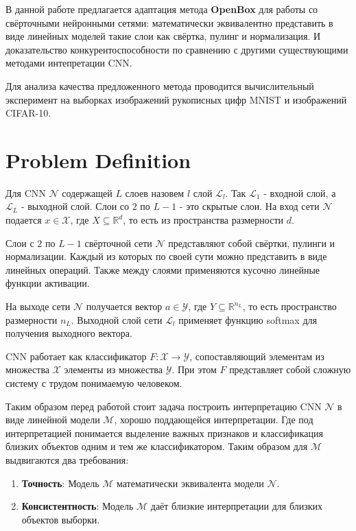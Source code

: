 \documentclass[12pt]{article}
\begin{document}
В данной работе предлагается адаптация метода \textbf{OpenBox} для работы со свёрточными нейронными сетями: математически эквивалентно представить в виде линейных моделей такие слои как свёртка, пулинг и нормализация. И доказательство конкурентоспособности по сравнению с другими существующими методами интепретации CNN.

Для анализа качества предложенного метода проводится вычислительный эксперимент на выборках изображений рукописных цифр MNIST и изображений CIFAR-10.



\section{Problem Definition}
\label{sec:headings}

Для CNN $\mathcal{N}$ содержащей $L$ слоев назовем $l$ слой $\mathcal{L}_l$. Так $\mathcal{L}_1$ - входной слой, а $\mathcal{L}_L$ - выходной слой. Слои со $2$ по $L-1$ - это скрытые слои. На вход сети $\mathcal{N}$ подается $x \in \mathcal{X}$, где $X \subseteq \mathbb{R}^d$, то есть из пространства размерности $d$. 

Слои с $2$ по $L-1$ свёрточной сети $\mathcal{N}$ представляют собой свёртки, пулинги и нормализации. Каждый из которых по своей сути можно представить в виде линейных операций. Также между слоями применяются кусочно линейные функции активации.

На выходе сети $\mathcal{N}$ получается вектор $a \in \mathcal{Y}$, где $Y \subseteq \mathbb{R}^{n_L}$, то есть пространство размерности $n_L$. Выходной слой сети $\mathcal{L}_l$ применяет функцию softmax для получения выходного вектора. 

CNN работает как классификатор $F: \mathcal{X} \rightarrow \mathcal{Y}$, сопоставляющий элементам из множества $\mathcal{X}$ элементы из множества $\mathcal{Y}$. При этом $F$ представляет собой сложную систему с трудом понимаемую человеком.

Таким образом перед работой стоит задача построить интерпретацию CNN $\mathcal{N}$ в виде линейной модели $\mathcal{M}$, хорошо поддающейся интерпретации. Где под интерпретацией понимается выделение важных признаков и классификация близких объектов одним и тем же классификатором. Таким образом для $\mathcal{M}$ выдвигаются два требования:
\begin{enumerate}
    \item \textbf{Точность}:
    Модель $\mathcal{M}$ математически эквивалента модели $\mathcal{N}$.
    \item \textbf{Консистентность}:
    Модель $\mathcal{M}$ даёт близкие интерпретации для близких объектов выборки.
\end{enumerate}



\end{document}
